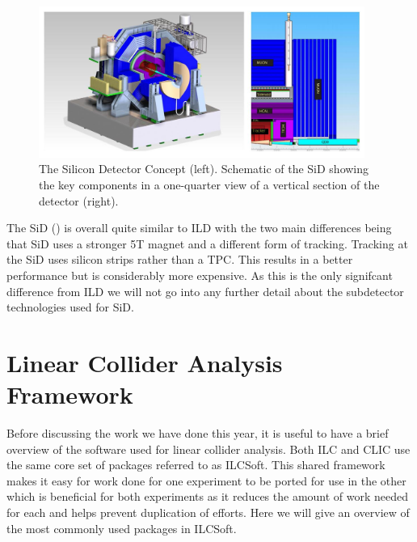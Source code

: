 \begin{figure}
  \centering
  \includegraphics[width=0.95\textwidth,keepaspectratio]{Experiments/fig/SiD}
  \caption[SiD Detector]{ The Silicon Detector Concept (left). Schematic of the SiD showing the key components in a one-quarter view of a vertical section of the detector (right). \cite{ILCTDR}}
  \label{Fig:SiD}
\end{figure}

The \ac{SiD} () is overall quite similar to ILD with the two main differences being that SiD uses a stronger 5T magnet and a different form of tracking. Tracking at the SiD uses silicon strips rather than a TPC. This results in a better performance but is considerably more expensive. As this is the only signifcant difference from ILD we will not go into any further detail about the subdetector technologies used for SiD.

\section{Linear Collider Analysis Framework}

Before discussing the work we have done this year, it is useful to have a brief overview of the software used for linear collider analysis. Both \ac{ILC} and \ac{CLIC} use the same core set of packages referred to as ILCSoft. This shared framework makes it easy for work done for one experiment to be ported for use in the other which is beneficial for both experiments as it reduces the amount of work needed for each and helps prevent duplication of efforts. Here we will give an overview of the most commonly used packages in ILCSoft.

